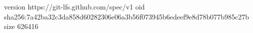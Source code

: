 version https://git-lfs.github.com/spec/v1
oid sha256:7a42ba32c3da858d60282306e06a3b56f073945b6edeef9e8d78b077b985c27b
size 626416
